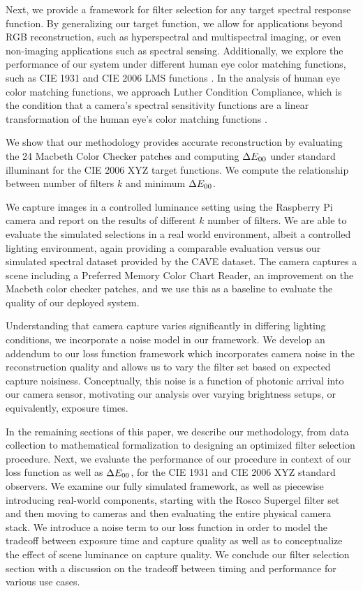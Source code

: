 Next, we provide a framework for filter selection for any target spectral response function. 
By generalizing our target function, we allow for applications beyond RGB reconstruction, such as hyperspectral and multispectral imaging, or even non-imaging applications such as spectral sensing.
Additionally, we explore the performance of our system under different human eye color matching functions, such as CIE 1931 \cite{1931TrOS...33...73S} and CIE 2006 LMS functions \cite{STOCKMAN201987}. %
In the analysis of human eye color matching functions, we approach Luther Condition Compliance, which is the condition that a camera's spectral sensitivity functions are a linear transformation of the human eye's color matching functions \cite{von1927gebiet}.

We show that our methodology provides accurate reconstruction by evaluating the 24 Macbeth Color Checker patches and computing $\Delta E_{00}$ under standard illuminant for the CIE 2006 XYZ target functions. 
We compute the relationship between number of filters $k$ and minimum $\Delta E_{00}$.

We capture images in a controlled luminance setting using the Raspberry Pi camera and report on the results of different $k$ number of filters. 
We are able to evaluate the simulated selections in a real world environment, albeit a controlled lighting environment, again providing a comparable evaluation versus our simulated spectral dataset provided by the CAVE dataset. 
The camera captures a scene including a Preferred Memory Color Chart Reader, an improvement on the Macbeth color checker patches, and we use this as a baseline to evaluate the quality of our deployed system. 

Understanding that camera capture varies significantly in differing lighting conditions, we incorporate a noise model in our framework.
We develop an addendum to our loss function framework which incorporates camera noise in the reconstruction quality and allows us to vary the filter set based on expected capture noisiness.
Conceptually, this noise is a function of photonic arrival into our camera sensor, motivating our analysis over varying brightness setups, or equivalently, exposure times.

In the remaining sections of this paper, we describe our methodology, from data collection to mathematical formalization to designing an optimized filter selection procedure.
Next, we evaluate the performance of our procedure in context of our loss function as well as $\Delta E_{00}$, for the CIE 1931 and CIE 2006 XYZ standard observers.
We examine our fully simulated framework, as well as piecewise introducing real-world components, starting with the Rosco Supergel filter set and then moving to cameras and then evaluating the entire physical camera stack.
We introduce a noise term to our loss function in order to model the tradeoff between exposure time and capture quality as well as to conceptualize the effect of scene luminance on capture quality.
We conclude our filter selection section with a discussion on the tradeoff between timing and performance for various use cases.
